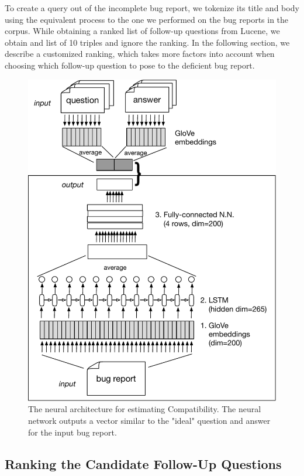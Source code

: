 To create a query out of the incomplete bug report, we tokenize its title and body
using the equivalent process to the one we performed on the bug reports in the corpus.
While obtaining a ranked list of follow-up questions from Lucene, we obtain and list of 10
triples and ignore the ranking. In the following section, we describe a customized ranking, which
takes more factors into account when choosing which follow-up question to pose to the deficient
bug report.


\begin{figure}[t]
\centering
\includegraphics[width=0.99\linewidth]{figures/compat_nn.pdf}
\caption{The neural architecture for estimating Compatibility. The neural network outputs a vector similar
to the "ideal" question and answer for the input bug report.}
\label{fig:pipeline}
\end{figure}


\subsection{Ranking the Candidate Follow-Up Questions}\label{sec:ranking}

